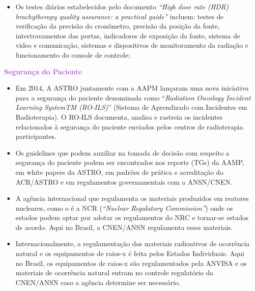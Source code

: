 \documentclass[11pt,a4paper]{article}
\newcounter{exemplo}
\begin{document}
\begin{exemplo}[Qualidade]
\begin{itemize}
        \item Os testes diários estabelecidos pelo documento  \textit{``High dose rate (HDR) brachytherapy quality assurance: a practical guide''} incluem: testes de verificação da precisão do cronômetro, precisão da posição da fonte, intertravamentos das portas, indicadores de exposição da fonte, sistema de video e comunicação, sistemas e dispositivos de monitoramento da radiação e funcionamento do console de controle;
      
    \end{itemize}

    \textcolor{MediumOrchid}{\LobsterTwo\textbf{Segurança do Paciente}}
    \begin{itemize}
        \item Em 2014, A ASTRO juntamente com a AAPM lançaram uma nova iniciativa para a segurança do paciente denominada como ``\textit{Radiation Oncology Incident Learning SystemTM (RO-ILS)}'' (Sistema de Aprendizado com Incidentes em Radioterapia). O RO-ILS documenta, analisa e rastreia os incidentes relacionados à segurança do paciente enviados pelos centros de radioterapia participantes. 
        
        \item Os guidelines que podem auxiliar na tomada de decisão com respeito a segurança do paciente podem ser encontrados nos reports (TGs) da AAMP, em white papers da ASTRO, em padrões de prática e acreditação do ACR/ASTRO e em regulamentos governamentais com a ANSN/CNEN.
        
        \item A agência internacional que regulamenta os materiais produzidos em reatores nucleares, como o  é a NCR (\textit{``Nuclear Regulatory Commission''}) onde os estados podem optar por adotar os regulamentos do NRC e tornar-se estados de acordo. Aqui no Brasil, a CNEN/ANSN regulamenta esses materiais.

        \item Internacionalmente, a regulamentação dos materiais radioativos de ocorrência natural e os equipamentos de raios-x é feita pelos Estados Individuais. Aqui no Brasil, os equipamentos de raios-x são regulamentados pela ANVISA e os materiais de ocorrência natural entram no controle regulatório da CNEN/ANSN caso a agência determine ser necessário.
        

\end{itemize}
\end{exemplo}
\end{document}
